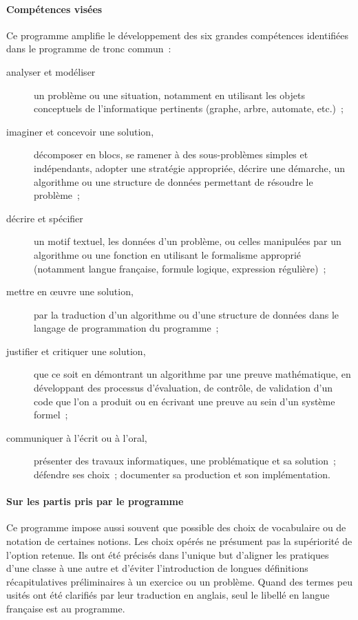 \paragraph{Compétences visées} Ce programme amplifie le développement des six grandes compétences identifiées dans le programme de tronc commun~:
\begin{description}
\item[analyser et modéliser] un problème ou une situation, notamment en utilisant les objets conceptuels de l'informatique pertinents (graphe, arbre, automate, etc.)~;
\item[imaginer et concevoir une solution,] décomposer en blocs, se ramener à des sous-problèmes simples et indépendants, adopter une stratégie appropriée, décrire une démarche, un algorithme ou une structure de données permettant de résoudre le problème~;
\item[décrire et spécifier] un motif textuel, les données d'un problème, ou celles manipulées par un algorithme ou une fonction en utilisant le formalisme approprié (notamment langue française, formule logique, expression régulière)~;
\item[mettre en \oe uvre une solution,] par la traduction d'un algorithme ou d'une structure de données dans le langage de programmation du programme~;
\item[justifier et critiquer une solution,] que ce soit en démontrant un algorithme par une preuve mathématique, en développant des processus d'évaluation, de contrôle, de validation d'un code que l'on a produit ou en écrivant une preuve au sein d'un système formel~;
\item[communiquer à l'écrit ou à l'oral,] présenter des travaux informatiques, une problématique et sa solution~; défendre ses choix~; documenter sa production et son implémentation. 
\end{description}


\paragraph{Sur les partis pris par le programme} 
Ce programme impose aussi souvent que possible des choix de vocabulaire ou de notation de certaines notions. Les choix opérés ne présument pas la supériorité de l'option retenue. Ils ont été précisés dans l'unique but d'aligner les pratiques d'une classe à une autre et d'éviter l'introduction de longues définitions récapitulatives préliminaires à un exercice ou un problème.
Quand des termes peu usités ont été clarifiés par leur traduction en anglais, seul le libellé en langue française est au programme.

